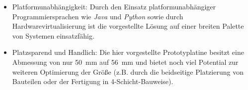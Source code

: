\begin{itemize}
    \item{Platformunabhängigkeit:} Durch den Einsatz platformunabhängiger Programmiersprachen wie \emph{Java}
          und \emph{Python} sowie durch Hardwarevirtualisierung ist die vorgestellte Lösung auf
          einer breiten Palette von Systemen einsatzfähig.

    \item{Platzsparend und Handlich:} Die hier vorgestellte Prototyplatine besitzt eine Abmessung von nur
          50~mm auf 56~mm und bietet noch viel Potential zur weiteren Optimierung der Größe (z.B. durch
          die beidseitige Platzierung von Bauteilen oder der Fertigung in 4-Schicht-Bauweise).
\end{itemize}
